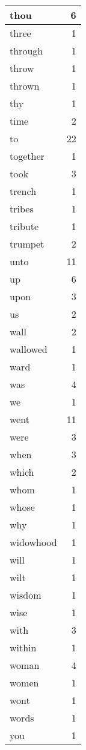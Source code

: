 \begin{center}
\begin{longtable}{l|r}
thou & 6 \\ \hline
three & 1 \\ \hline
through & 1 \\ \hline
throw & 1 \\ \hline
thrown & 1 \\ \hline
thy & 1 \\ \hline
time & 2 \\ \hline
to & 22 \\ \hline
together & 1 \\ \hline
took & 3 \\ \hline
trench & 1 \\ \hline
tribes & 1 \\ \hline
tribute & 1 \\ \hline
trumpet & 2 \\ \hline
unto & 11 \\ \hline
up & 6 \\ \hline
upon & 3 \\ \hline
us & 2 \\ \hline
wall & 2 \\ \hline
wallowed & 1 \\ \hline
ward & 1 \\ \hline
was & 4 \\ \hline
we & 1 \\ \hline
went & 11 \\ \hline
were & 3 \\ \hline
when & 3 \\ \hline
which & 2 \\ \hline
whom & 1 \\ \hline
whose & 1 \\ \hline
why & 1 \\ \hline
widowhood & 1 \\ \hline
will & 1 \\ \hline
wilt & 1 \\ \hline
wisdom & 1 \\ \hline
wise & 1 \\ \hline
with & 3 \\ \hline
within & 1 \\ \hline
woman & 4 \\ \hline
women & 1 \\ \hline
wont & 1 \\ \hline
words & 1 \\ \hline
you & 1 \\ \hline
\end{longtable}
\end{center}



